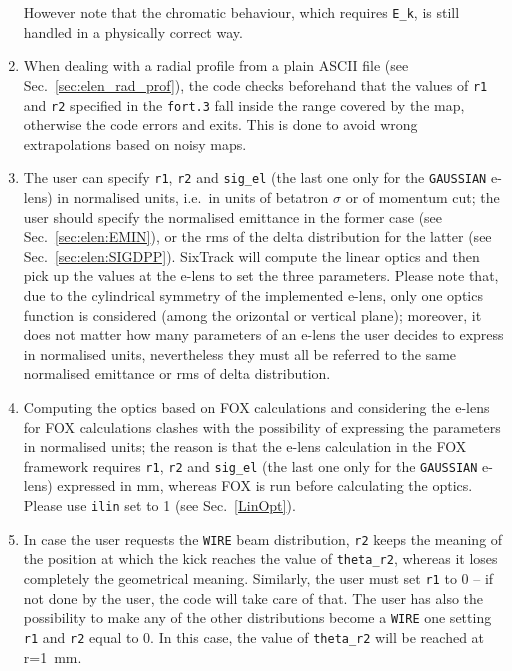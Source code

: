 \begin{enumerate}
  However note that the chromatic behaviour, which requires \texttt{E\_k}, is still handled in a physically correct way.
\item When dealing with a radial profile from a plain ASCII file (see Sec.~\ref{sec:elen_rad_prof}), the code checks beforehand that the values of \texttt{r1} and \texttt{r2} specified in the \texttt{fort.3} fall inside the range covered by the map, otherwise the code errors and exits. This is done to avoid wrong extrapolations based on noisy maps.
\item The user can specify \texttt{r1}, \texttt{r2} and \texttt{sig\_el} (the last one only for the \texttt{GAUSSIAN} e-lens) in normalised units, i.e.~in units of betatron $\sigma$ or of momentum cut; the user should specify the normalised emittance in the former case (see Sec.~\ref{sec:elen:EMIN}), or the rms of the delta distribution for the latter (see Sec.~\ref{sec:elen:SIGDPP}). SixTrack will compute the linear optics and then pick up the values at the e-lens to set the three parameters. Please note that, due to the cylindrical symmetry of the implemented e-lens, only one optics function is considered (among the orizontal or vertical plane); moreover, it does not matter how many parameters of an e-lens the user decides to express in normalised units, nevertheless they must all be referred to the same normalised emittance or rms of delta distribution.
\item Computing the optics based on FOX calculations and considering the e-lens for FOX calculations clashes with the possibility of expressing the parameters in normalised units; the reason is that the e-lens calculation in the FOX framework requires \texttt{r1}, \texttt{r2} and \texttt{sig\_el} (the last one only for the \texttt{GAUSSIAN} e-lens) expressed in mm, whereas FOX is run before calculating the optics. Please use \texttt{ilin} set to 1 (see Sec.~\ref{LinOpt}).
\item In case the user requests the \texttt{WIRE} beam distribution, \texttt{r2} keeps the meaning of the position at which the kick reaches the value of \texttt{theta\_r2}, whereas it loses completely the geometrical meaning.
Similarly, the user must set \texttt{r1} to 0 -- if not done by the user, the code will take care of that.
The user has also the possibility to make any of the other distributions become a \texttt{WIRE} one setting \texttt{r1} and \texttt{r2} equal to 0.
In this case, the value of \texttt{theta\_r2} will be reached at r=1~mm.

\end{enumerate}

